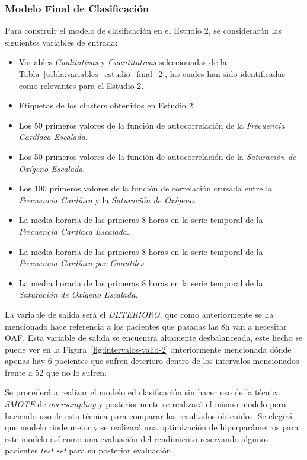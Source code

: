 \subsubsection{Modelo Final de Clasificación}

Para construir el modelo de clasificación en el Estudio 2, se considerarán las siguientes variables de entrada:

\begin{itemize}
    \item Variables \textit{Cualitativas} y \textit{Cuantitativas} seleccionadas de la Tabla~\ref{tabla:variables_estudio_final_2}, las cuales han sido identificadas como relevantes para el Estudio 2.
    \item Etiquetas de los clusters obtenidos en Estudio 2.
    \item Los 50 primeros valores de la función de autocorrelación de la \textit{Frecuencia Cardíaca Escalada}.
    \item Los 50 primeros valores de la función de autocorrelación de la \textit{Saturación de Oxígeno Escalada}.
    \item Los 100 primeros valores de la función de correlación cruzada entre la \textit{Frecuencia Cardíaca} y la \textit{Saturación de Oxígeno}.
    \item La media horaria de las primeras 8 horas en la serie temporal de la \textit{Frecuencia Cardíaca Escalada}.
    \item La media horaria de las primeras 8 horas en la serie temporal de la \textit{Frecuencia Cardíaca por Cuantiles}.
    \item La media horaria de las primeras 8 horas en la serie temporal de la \textit{Saturación de Oxígeno Escalada}.
\end{itemize}

La variable de salida será el \textit{DETERIORO}, que como anteriormente se ha mencionado hace referencia a los pacientes que  pasadas las 8h van a necesitar OAF. Esta variable de salida se encuentra altamente desbalanceada, este hecho se puede ver en la Figura~\ref{fig:intervalos-valid-2} anteriormente mencionada dónde apenas hay 6 pacientes que sufren deterioro dentro de los intervalos mencionados frente a 52 que no lo sufren.

Se procederá a realizar el modelo ed clasificación sin hacer uso de la técnica \textit{SMOTE} de \textit{oversampling} y posteriormente se realizará el mismo modelo pero haciendo uso de esta técnica para comparar los resultados obtenidos. Se elegirá que modelo rinde mejor y se realizará una optimización de hiperparámetros para este modelo así como una evaluación del rendimiento reservando algunos pacientes \textit{test set} para su posterior evaluación.

